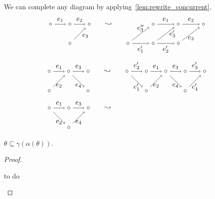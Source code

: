 We can complete any diagram by applying~\autoref{lem:rewrite_concurrent}.
\[
\begin{tikzpicture} %
  \node (n2) at (-1,1) {\(\circ\)};
  \node (m2) at (0,0) {\(\circ\)};
  \node (m1) at (0,1) {\(\circ\)};
  \node (n) at (1,1) {\(\circ\)};
  \node (implies) at (2,1) {\(\leadsto\)};
  \node (mm2) at (5.6,0) {\(\circ\)};
  \node (mm1) at (5.6,1) {\(\circ\)};
  \node (nn) at (6.9,1) {\(\circ\)};
  \node (mm) at (4.3,0) {\(\circ\)};
  \node (nn1) at (3,0) {\(\circ\)};
  \node (nn2) at (4.3,1) {\(\circ\)};
  \node (text) at (0.8,0.4) {\(e_3\)};
  \node (text1) at (5.3,0.5) {\(e_3'\)};
  \draw [->] (n2) -- node [left,above] {\(e_1\)} (m1);
  \draw [->] (m1) -- node [left,above] {\(e_2\)} (n);
  \draw [->] (m2) -- (n);
  \draw [->] (nn2) -- node [left,above] {\(e_1\)} (mm1);
  \draw [->] (mm1) -- node [left,above] {\(e_2\)} (nn);
  \draw [->] (mm2) -- node [left,below] {\(e_3\)} (nn);
  \draw [->] (mm) -- node [left,below] {\(e_2'\)} (mm2);
  \draw [->] (mm) -- (mm1);
  \draw [->] (nn1) -- node [above] {\(e_3''\)} (nn2);
  \draw [->] (nn1) -- node [left,below] {\(e_1'\)} (mm);
\end{tikzpicture}
\]
\[
\begin{tikzpicture} %
  \node (m2) at (0,0) {\(\circ\)};
  \node (m1) at (0,1) {\(\circ\)};
  \node (n) at (1,1) {\(\circ\)};
  \node (n1) at (2,1) {\(\circ\)};
  \node (n2) at (2,0) {\(\circ\)};
  \node (implies) at (3,1) {\(\leadsto\)};
  \node (m) at (4,1) {\(\circ\)};
  \node (mm2) at (5,0) {\(\circ\)};
  \node (mm1) at (5,1) {\(\circ\)};
  \node (nn) at (6,1) {\(\circ\)};
  \node (nn1) at (7,1) {\(\circ\)};
  \node (nn2) at (7,0) {\(\circ\)};
  \node (p) at (8,1) {\(\circ\)};
  \draw [->] (n) -- node [left,above] {\(e_3\)} (n1);
  \draw [->] (n) -- node [left,below] {\(e_4\)} (n2);
  \draw [->] (m1) -- node [left,above] {\(e_1\)} (n);
  \draw [->] (m2) -- node [left,below] {\(e_2\)} (n);
  \draw [->] (nn) -- node [left,above] {\(e_3\)} (nn1);
  \draw [->] (nn) -- node [left,below] {\(e_4\)} (nn2);
  \draw [->] (mm1) -- node [left,above] {\(e_1\)} (nn);
  \draw [->] (mm2) -- node [left,below] {\(e_2\)} (nn);
  \draw [->] (m) -- node [left,above] {\(e_2'\)} (mm1);
  \draw [->] (m) -- node [left,below] {\(e_1'\)} (mm2);
  \draw [->] (nn1) -- node [left,above] {\(e_3'\)} (p);
  \draw [->] (nn2) -- node [left,below] {\(e_4'\)} (p);
\end{tikzpicture}
\]
\[
\begin{tikzpicture} %
  \node (m) at (-1,1) {\(\circ\)};
  \node (m2) at (0,0) {\(\circ\)};
  \node (m1) at (0,1) {\(\circ\)};
  \node (n) at (1,1) {\(\circ\)};
  \node (implies) at (2,1) {\(\leadsto\)};
  \node (implies2) at (7,1) {\(~\)};
  \draw [->] (m) -- node [left,above] {\(e_1\)} (m1);
  \draw [->] (m) -- node [left,below] {\(e_2\)} (m2);
  \draw [->] (m1) -- node [left,above] {\(e_3\)} (n);
  \draw [->] (m2) -- node [left,below] {\(e_4\)} (n);
\end{tikzpicture}
\]

\begin{lemma}
  $\theta\subseteq \gamma(\alpha(\theta))$.
\end{lemma}
\begin{proof}
    \begin{mdframed}[backgroundcolor=blue!20]
    to do
  \end{mdframed}

\end{proof}
